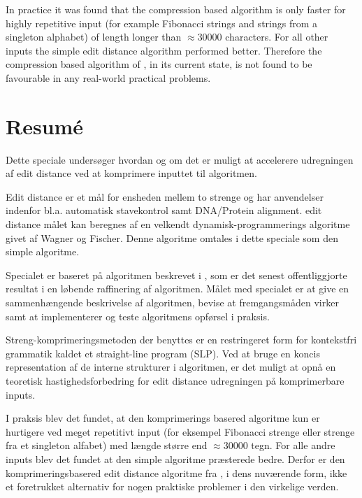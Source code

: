 \documentclass[twoside,11pt,openright]{report}
\begin{document}
In practice it was found that the compression based algorithm is only faster for highly repetitive input (for example Fibonacci strings and strings from a singleton alphabet) of length longer than $\approx 30000$ characters. For all other inputs the simple edit distance algorithm performed better. Therefore the compression based algorithm of \cite{Gawrychowski:2012:FAC:2422024.2422048}, in its current state, is not found to be favourable in any real-world practical problems.

\chapter*{Resum\'e}

Dette speciale undersøger hvordan og om det er muligt at accelerere udregningen af edit distance ved at komprimere inputtet til algoritmen.

Edit distance er et mål for ensheden mellem to strenge og har anvendelser indenfor bl.a. automatisk stavekontrol samt DNA/Protein alignment. edit distance målet kan beregnes af en velkendt dynamisk-programmerings algoritme givet af Wagner og Fischer. Denne algoritme omtales i dette speciale som den simple algoritme.

Specialet er baseret på algoritmen beskrevet i \cite{Gawrychowski:2012:FAC:2422024.2422048}, som er det senest offentliggjorte resultat i en løbende raffinering af algoritmen. Målet med specialet er at give en sammenhængende beskrivelse af algoritmen, bevise at fremgangsmåden virker samt at implementerer og teste algoritmens opførsel i praksis.

Streng-komprimeringsmetoden der benyttes er en restringeret form for kontekstfri grammatik kaldet et straight-line program (SLP). Ved at bruge en koncis representation af de interne strukturer i algoritmen, er det muligt at opnå en teoretisk hastighedsforbedring for edit distance udregningen på komprimerbare inputs.

I praksis blev det fundet, at den komprimerings basered algoritme kun er hurtigere ved meget repetitivt input (for eksempel Fibonacci strenge eller strenge fra et singleton alfabet) med længde større end $\approx 30000$ tegn. For alle andre inputs blev det fundet at den simple algoritme præsterede bedre. Derfor er den komprimeringsbasered edit distance algoritme fra \cite{Gawrychowski:2012:FAC:2422024.2422048}, i dens nuværende form, ikke et foretrukket alternativ for nogen praktiske problemer i den virkelige verden.
\end{document}
